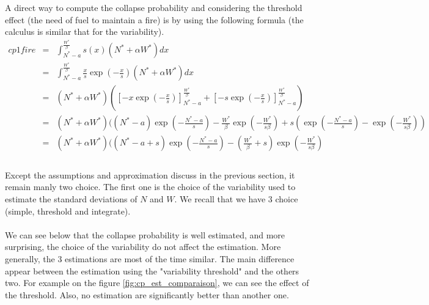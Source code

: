 \documentclass{article}
\begin{document}
\paragraph{}
\\
A direct way to compute the collapse probability and considering the threshold effect (the need of fuel to maintain a fire) is by using the following formula (the calculus is similar that for the variability).
\[
\begin{array}{rcl}
cp1fire &=& \int_{N^*-a}^{\frac{W^*}{\beta}}s(x)(N^*+\alpha W^*)dx \\
&=& \int_{N^*-a}^{\frac{W^*}{\beta}} \frac{x}{s}\exp(-\frac{x}{s})(N^*+\alpha W^*)dx \\
&=& (N^*+\alpha W^*)([-x\exp(-\frac{x}{s})]_{N^*-a}^{\frac{W^*}{\beta}} +  [ -s\exp(-\frac{x}{s})]_{N^*-a}^{\frac{W^*}{\beta}}) \\
&=& (N^*+\alpha W^*)((N^*-a)\exp(-\frac{N^*-a}{s}) - \frac{W^*}{\beta}\exp(-\frac{W^*}{s\beta}) + s(\exp(-\frac{N^*-a}{s})- \exp(-\frac{W^*}{s\beta})) \\
&=& (N^*+\alpha W^*)((N^*-a+s)\exp(-\frac{N^*-a}{s}) - (\frac{W^*}{\beta}+s)\exp(-\frac{W^*}{s\beta}) \\
\end{array}
\]



\paragraph{}
Except the assumptions and approximation discuss in the previous section, it remain manly two choice. The first one is the choice of the variability used to estimate the standard deviations of $N$ and $W$. We recall that we have $3$ choice (simple, threshold and integrate).

\paragraph{}
We can see below that the collapse probability is well estimated, and more surprising, the choice of the variability do not affect the estimation. More generally, the 3 estimations are most of the time similar. The main difference appear between the estimation using the "variability threshold" and the others two. For example on the figure \ref{fig:cp_est_comparaison}, we can see the effect of the threshold. Also, no estimation are significantly better than another one.
\end{document}

